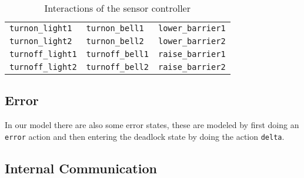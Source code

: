 \documentclass[final]{report}
\begin{document}
\begin{table}[H]
\centering
    \begin{tabular}{|l|l|l|}
    \hline
\nameref{sec:architecture-light-controller} & \nameref{sec:architecture-bell-controller} & \nameref{sec:architecture-barrier-controller} \\ \hline
\texttt{turnon\_light1}                     & \texttt{turnon\_bell1}                     & \texttt{lower\_barrier1} \\
\texttt{turnon\_light2}                     & \texttt{turnon\_bell2}                     & \texttt{lower\_barrier2} \\
\texttt{turnoff\_light1}                    & \texttt{turnoff\_bell1}                    & \texttt{raise\_barrier1} \\
\texttt{turnoff\_light2}                    & \texttt{turnoff\_bell2}                    & \texttt{raise\_barrier2} \\ \hline
    \end{tabular}
    \caption{Interactions of the sensor controller}
    \label{tab:sensorSignals}
\end{table}

\subsection{Error}
In our model there are also some error states, these are modeled by first doing an \texttt{error} action and then entering the deadlock state by doing the action \texttt{delta}.


\subsection{Internal Communication}
\end{document}
